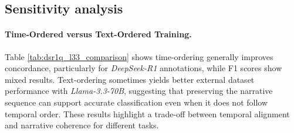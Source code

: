 \subsection{Sensitivity analysis}


\paragraph{Time-Ordered versus Text-Ordered Training.}

Table \ref{tab:dsr1q_l33_comparison} shows time-ordering generally improves concordance, particularly for \textit{DeepSeek-R1} annotations, while F1 scores show mixed results. Text-ordering sometimes yields better external dataset performance with \textit{Llama-3.3-70B}, suggesting that preserving the narrative sequence can support accurate classification even when it does not follow temporal order.  These results highlight a trade-off between temporal alignment and narrative coherence for different tasks.



